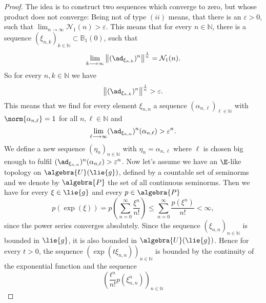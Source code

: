 \documentclass[
11pt,                          %
english                        %
]{article}
\begin{document}
\begin{proof}
	The idea is to construct two sequences which converge to zero, but whose 
	product does not converge: Being not of type $(ii)$ means, that there is an
	$\varepsilon > 0$, such that $\lim_{n \rightarrow \infty} \mathcal{N}_1(n) > 
	\varepsilon$. This means that for every $n \in \mathbb{N}$, there is a sequence 
	$\left(\xi_{n, k} \right)_{k \in \mathbb{N}} \subset \mathbb{B}_1(0)$, 
	such that
	\begin{equation*}
		\lim_{k \longrightarrow \infty}
		\left\Vert
			(\ad_{\xi_{n, k}})^n
		\right\Vert^{\frac{1}{n}}
		=
		\mathcal{N}_1(n).
	\end{equation*}
	So for every $n, k \in \mathbb{N}$ we have
	\begin{equation*}
		\left\Vert
			(\ad_{\xi_{n, k}})^n
		\right\Vert^{\frac{1}{n}}
		> \varepsilon.
	\end{equation*}
	This means that we find for every element $\xi_{n,n}$ a sequence 
	$(\alpha_{n, \ell})_{\ell \in \mathbb{N}}$ with $\norm{\alpha_{n, \ell}} = 1$ 
	for all $n, \ell \in \mathbb{N}$ and
	\begin{equation*}
		\lim_{\ell \longrightarrow \infty}
		(\ad_{\xi_{n,n}})^n(\alpha_{n,\ell})
		> 
		\varepsilon^n.
	\end{equation*}
	We define a new sequence $(\eta_n)_{n \in \mathbb{N}}$ with 
	$\eta_n = \alpha_{n, \ell}$ where $\ell$ is chosen big enough to 
	fulfil $(\ad_{\xi_{n,n}})^n(\alpha_{n,\ell}) > \varepsilon^n$.
	Now let's assume we have an $\E$-like topology on $\algebra{U}(\lie{g})$, 
	defined by a countable set of seminorms and we denote by $\algebra{P}$ the set 
	of all continuous seminorms. Then we have for every $\xi \in \lie{g}$ and every 
	$p \in \algebra{P}$
	\begin{equation*}
		p \left( \exp(\xi) \right)
		=
		p \left(
			\sum\limits_{n=0}^\infty
			\frac{\xi^n}{n!}
		\right)
		\leq
		\sum\limits_{n=0}^\infty
		\frac{p\left( \xi^n \right)}{n!}
		<
		\infty,
	\end{equation*}
	since the power series converges absolutely. Since the sequence $(\xi_{n,n})_{n 
	\in \mathbb{N}}$ is bounded in $\lie{g}$, it is also bounded in $\algebra{U}
	(\lie{g})$. Hence for every $t > 0$, the sequence $(\exp(t \xi_{n,n}))_{n \in 
	\mathbb{N}}$ is bounded by the continuity of the exponential function and the 
	sequence
	\begin{equation*}
		\left(
			\frac{t^n}{n!}
			p\left(
				\xi_{n,n}^n
			\right)
		\right)_{n \in \mathbb{N}}
	\end{equation*}

\end{proof}
\end{document}
